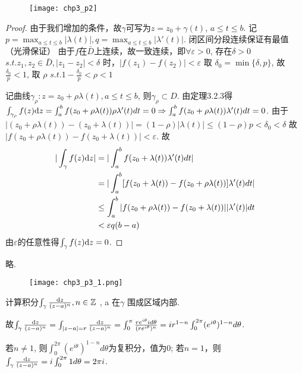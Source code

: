 \begin{figure}[h]
	\centering
	\texttt{[image: chp3\_p2]}
\end{figure}

\begin{proof}
	由于我们增加的条件，故$\gamma$可写为$z = z_0 + \gamma(t)$, $a \leq t \leq b$.
	记$p = \max_{a \leq t \leq b} \vert \lambda (t) \vert, q = \max_{a \leq t \leq b} \vert \lambda'(t) \vert$. 闭区间分段连续保证有最值（光滑保证）
	由于$f$在$\bar{D}$上连续，故一致连续，即$\forall \varepsilon > 0$, 存在$\delta > 0$ $s.t. z_1, z_2 \in \bar{D}, \vert z_1 - z_2 \vert < \delta$ 时，$\vert f(z_1) - f(z_2) \vert < \varepsilon$
	取 $\delta_0 = \min \{ \delta, p \}$, 故$\frac{\delta_0}{p} <1 $, 取 $\rho$ $ s.t. 1 - \frac{\delta_0}{p} < \rho < 1$
	
	记曲线$\gamma_\rho: z = z_0 + \rho \lambda(t), a \leq t \leq b$, 则$\gamma_\rho \subset D$. 由定理3.2.3得 $\int_{\gamma_\rho} f(z)\mathrm{d}z = \int_a^b f(z_0 + \rho \lambda(t)) \rho \lambda'(t) dt = 0 \Rightarrow \int_a^b f(z_0 + \rho \lambda(t)) \lambda'(t) dt = 0$.
	由于$\vert (z_0 + \rho \lambda(t)) - (z_0 + \lambda(t)) \vert = (1 - \rho) \vert \lambda(t) \vert \leq (1-\rho) p < \delta_0 < \delta$
	故$\vert f(z_0 + \rho \lambda(t)) - f(z_0 + \lambda(t)) \vert < \varepsilon$.
	故
	\begin{align*}
	\vert \int_\gamma f(z) \mathrm{d}z \vert &= \vert \int_a ^b f(z_0 + \lambda(t)) \lambda'(t) dt \vert \\
	&= \vert \int_a^b [f(z_0 + \lambda(t)) - f(z_0 + \rho \lambda(t))] \lambda'(t) dt \vert\\
	&\leq \int_a^b \vert f(z_0 + \rho \lambda(t)) - f(z_0 + \lambda(t)) \vert \vert \lambda'(t) \vert dt\\
	&< \varepsilon q(b-a)
	\end{align*}
	由$\varepsilon$的任意性得$\int_\gamma f(z) \mathrm{d}z = 0$.
	
\end{proof}




\begin{mypro}  略.
\end{mypro}

\begin{figure}[h]
	\centering
	\texttt{[image: chp3\_p3\_1.png]}
\end{figure}
\begin{eg}
	计算积分$\int_\gamma \frac{\mathrm{d}z}{(z - a)^n}, n \in \mathbb{Z}$ , a 在$\gamma$ 围成区域内部.
\end{eg}
\begin{jie}{}
	
	故$\int_\gamma \frac{\mathrm{d}z}{(z-a)^n} = \int_{|z-a| = r} \frac{\mathrm{d}z}{(z-a) ^n}  = \int_0 ^ \pi \frac{r e ^{i \theta} i d \theta}{(re^{i \theta})^n} = i r^{1-n} \int_0^{2\pi} (e^{i\theta})^{1-n} d \theta$.
	
	若$n \neq 1$, 则$\int_0 ^{2\pi} (e^{i \theta})^{1-n} d\theta$为复积分，值为0;
	若$n=1$，则$\int_\gamma \frac{\mathrm{d}z}{(z - a)^n} = i \int_0 ^{2\pi} 1 d\theta = 2\pi i$.
\end{jie}


